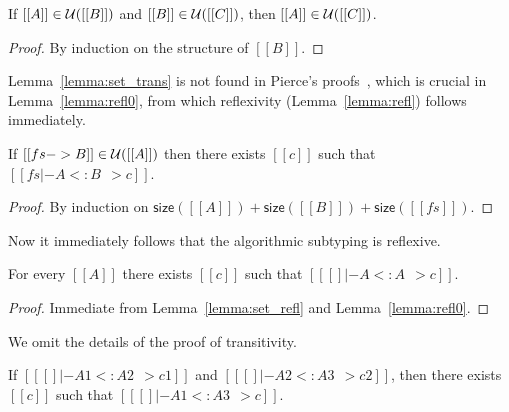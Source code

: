 \begin{lemma} \label{lemma:set_trans}
  If $[[A]] \in \mathcal{U}([[B]])$ and $[[B]] \in \mathcal{U}([[C]])$, then $[[A]] \in \mathcal{U}([[C]])$.
\end{lemma}
\begin{proof}
  By induction on the structure of $[[B]]$.
\end{proof}

\begin{remark}
  Lemma~\ref{lemma:set_trans} is not found in Pierce's proofs~\cite{pierce1989decision}, which is
  crucial in Lemma~\ref{lemma:refl0}, from which reflexivity (Lemma~\ref{lemma:refl})
  follows immediately.
\end{remark}


\begin{lemma} \label{lemma:refl0}
  If $[[fs -> B]] \in \mathcal{U}([[A]])$ then there exists $[[c]]$ such that $[[fs |- A <: B ~~> c]]$.
\end{lemma}
\begin{proof}
  By induction on $\mathsf{size}([[A]]) + \mathsf{size}([[B]]) + \mathsf{size}([[fs]])$.
\end{proof}

Now it immediately follows that the algorithmic subtyping is reflexive.

\begin{lemma}[Reflexivity] \label{lemma:refl}
  For every $[[A]]$ there exists $[[c]]$ such that $[[ [] |- A <: A ~~> c]]$.
\end{lemma}
\begin{proof}
  Immediate from Lemma~\ref{lemma:set_refl} and Lemma~\ref{lemma:refl0}.
\end{proof}

We omit the details of the proof of transitivity.

\begin{lemma}[Transitivity] \label{lemma:trans}
  If $[[ [] |- A1 <: A2 ~~> c1]]$ and $[[ [] |- A2 <: A3 ~~> c2]]$, then there
  exists $[[c]]$ such that $[[ [] |- A1 <: A3 ~~> c]]$.
\end{lemma}

